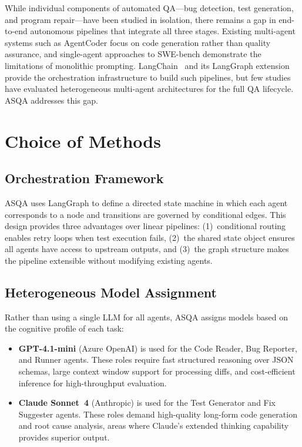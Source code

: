 \documentclass[conference]{IEEEtran}
\begin{document}
While individual components of automated QA---bug detection, test generation, and program repair---have been studied in isolation, there remains a gap in end-to-end autonomous pipelines that integrate all three stages. Existing multi-agent systems such as AgentCoder focus on code generation rather than quality assurance, and single-agent approaches to SWE-bench demonstrate the limitations of monolithic prompting. LangChain~\cite{chase2022} and its LangGraph extension provide the orchestration infrastructure to build such pipelines, but few studies have evaluated heterogeneous multi-agent architectures for the full QA lifecycle. ASQA addresses this gap.

\section{Choice of Methods}

\subsection{Orchestration Framework}

ASQA uses LangGraph to define a directed state machine in which each agent corresponds to a node and transitions are governed by conditional edges. This design provides three advantages over linear pipelines: (1)~conditional routing enables retry loops when test execution fails, (2)~the shared state object ensures all agents have access to upstream outputs, and (3)~the graph structure makes the pipeline extensible without modifying existing agents.

\subsection{Heterogeneous Model Assignment}

Rather than using a single LLM for all agents, ASQA assigns models based on the cognitive profile of each task:

\begin{itemize}
    \item \textbf{GPT-4.1-mini} (Azure OpenAI) is used for the Code Reader, Bug Reporter, and Runner agents. These roles require fast structured reasoning over JSON schemas, large context window support for processing diffs, and cost-efficient inference for high-throughput evaluation.
    \item \textbf{Claude Sonnet~4} (Anthropic) is used for the Test Generator and Fix Suggester agents. These roles demand high-quality long-form code generation and root cause analysis, areas where Claude's extended thinking capability provides superior output.
\end{itemize}
\end{document}

